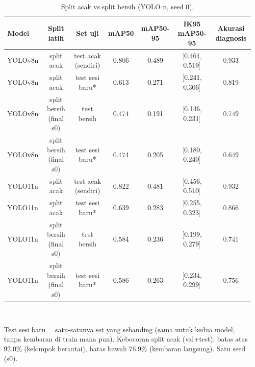 \begin{table}[!t]
\centering
\caption{Split acak vs split bersih (YOLO n, seed 0).}
\label{tab:split_acak}
\footnotesize
\begin{tabular}{lcccccc}
\hline
\textbf{Model} & \textbf{Split latih} & \textbf{Set uji} & \textbf{mAP50} & \textbf{mAP50-95} & \textbf{IK95 mAP50-95} & \textbf{Akurasi diagnosis} \\
\hline
YOLOv8n & split acak & test acak (sendiri) & 0.806 & 0.489 & [0.464, 0.519] & 0.933 \\
YOLOv8n & split acak & test sesi baru* & 0.613 & 0.271 & [0.241, 0.306] & 0.819 \\
YOLOv8n & split bersih (final s0) & test bersih & 0.474 & 0.191 & [0.146, 0.231] & 0.749 \\
YOLOv8n & split bersih (final s0) & test sesi baru* & 0.474 & 0.205 & [0.180, 0.240] & 0.649 \\
YOLO11n & split acak & test acak (sendiri) & 0.822 & 0.481 & [0.456, 0.510] & 0.932 \\
YOLO11n & split acak & test sesi baru* & 0.639 & 0.283 & [0.255, 0.323] & 0.866 \\
YOLO11n & split bersih (final s0) & test bersih & 0.584 & 0.236 & [0.199, 0.279] & 0.741 \\
YOLO11n & split bersih (final s0) & test sesi baru* & 0.586 & 0.263 & [0.234, 0.299] & 0.756 \\
\hline
\end{tabular}
\\[2pt]\parbox{\columnwidth}{\scriptsize *Test sesi baru = satu-satunya set yang sebanding (sama untuk kedua model, tanpa kembaran di train mana pun). Kebocoran split acak (val+test): batas atas 92.0\% (kelompok berantai), batas bawah 76.9\% (kembaran langsung). Satu seed (s0).}
\end{table}
